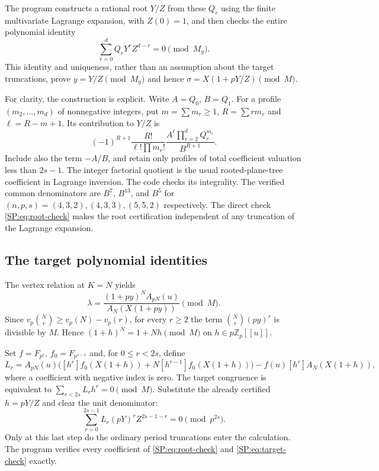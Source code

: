 \documentclass[11pt,a4paper]{article}
\theoremstyle{definition}\newtheorem{definition}[theorem]{Definition}
\theoremstyle{remark}\newtheorem{remark}[theorem]{Remark}
\newcommand{\Z}{\mathbb Z}
\newcommand{\vp}{v_p}
\numberwithin{equation}{section}
\begin{document}
The program constructs a rational root $Y/Z$ from these $Q_r$ using
the finite multivariate Lagrange expansion, with $Z(0)=1$, and then
checks the entire polynomial identity
\begin{equation}\label{SP:eq:root-check}
 \sum_{r=0}^d Q_rY^r Z^{d-r}=0\pmod{M_y}.
\end{equation}
This identity and uniqueness, rather than an assumption about the
target truncations, prove $y=Y/Z\pmod{M_y}$ and hence
$\sigma=X(1+pY/Z)\pmod M$.

For clarity, the construction is explicit. Write $A=Q_0$, $B=Q_1$.
For a profile $(m_2,\ldots,m_d)$ of nonnegative integers, put
$m=\sum m_r\ge1$, $R=\sum r m_r$ and $\ell=R-m+1$. Its contribution to
$Y/Z$ is
\[
 (-1)^{R+1}\frac{R!}{\ell!\prod m_r!}
 \frac{A^\ell\prod_{r=2}^d Q_r^{m_r}}{B^{R+1}}.
\]
Include also the term $-A/B$, and retain only profiles of total
coefficient valuation less than $2s-1$.
The integer factorial quotient is the usual rooted-plane-tree
coefficient in Lagrange inversion. The code checks its integrality.
The verified common denominators are $B^7$, $B^{13}$, and $B^5$ for $(n,p,s)=(4,3,2),(4,3,3),(5,5,2)$ respectively.
The direct check \eqref{SP:eq:root-check} makes the root certification
independent of any truncation of the Lagrange expansion.

\subsection{The target polynomial identities}
The vertex relation at $K=N$ yields
\[
 \lambda=\frac{(1+py)^N A_{pN}(u)}{A_N(X(1+py))}\pmod M.
\]
Since $\vp\binom Nr\ge\vp(N)-\vp(r)$, for every $r\ge2$ the term
$\binom Nr(py)^r$ is divisible by $M$. Hence
$(1+h)^N=1+Nh\pmod M$ on $h\in p\Z_p[[u]]$.

Set $f=F_{p^s}$, $f_0=F_{p^{s-1}}$ and, for $0\le r<2s$, define
\[
 L_r=A_{pN}(u)\bigl([h^r]f_0(X(1+h))
               +N[h^{r-1}]f_0(X(1+h))\bigr)
          -f(u)[h^r]A_N(X(1+h)),
\]
where a coefficient with negative index is zero.
The target congruence is equivalent to
$\sum_{r<2s}L_rh^r=0\pmod M$.
Substitute the already certified $h=pY/Z$ and clear the unit denominator:
\begin{equation}\label{SP:eq:target-check}
 \boxed{\ \sum_{r=0}^{2s-1}L_r(pY)^r Z^{2s-1-r}=0\pmod{p^{2s}}.\ }
\end{equation}
Only at this last step do the ordinary period truncations enter the
calculation. The program verifies every coefficient of
\eqref{SP:eq:root-check} and \eqref{SP:eq:target-check} exactly.
\end{document}
